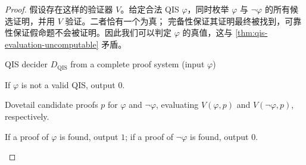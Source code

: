 \begin{proof}
  假设存在这样的验证器 $V$。给定合法 QIS $\varphi$，同时枚举
  $\varphi$ 与 $\lnot\varphi$ 的所有候选证明，并用 $V$ 验证。二者恰有一个为真；
  完备性保证其证明最终被找到，可靠性保证假命题不会被证明。因此我们可以判定
  $\varphi$ 的真值，这与 \cref{thm:qis-evaluation-uncomputable} 矛盾。

  \begin{pseudocode}{QIS decider $D_{\mathrm{QIS}}$ from a complete proof
      system (input $\varphi$)}
    \item If $\varphi$ is not a valid QIS, output $0$.
    \item Dovetail candidate proofs $p$ for $\varphi$ and $\lnot\varphi$,
      evaluating $V(\varphi,p)$ and $V(\lnot\varphi,p)$, respectively.
    \item If a proof of $\varphi$ is found, output $1$; if a proof of
      $\lnot\varphi$ is found, output $0$.
  \end{pseudocode}
\end{proof}
